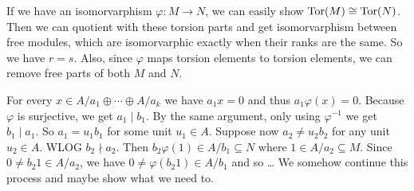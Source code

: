\begin{exercise}{4}
\begin{enumerate}
            If we have an isomorvarphism $\varphi \colon M \rightarrow N$, we can
            easily show $\operatorname{Tor}(M) \cong \operatorname{Tor}(N)$. Then we can quotient with these
            torsion parts and get isomorvarphism between free modules, which are
            isomorvarphic exactly when their ranks are the same. So we have $r =
            s$. Also, since $\varphi$ maps torsion elements to torsion elements, we
            can remove free parts of both $M$ and $N$.

            For every $x \in A/a_1 \oplus \cdots \oplus A/a_k$ we have $a_1 x =
            0$ and thus $a_1 \varphi(x) = 0$. Because $\varphi$ is surjective,
            we get $a_1 \mid b_1$. By the same argument, only using
            $\varphi^{-1}$ we get $b_1 \mid a_1$. So $a_1 = u_1 b_1$ for some
            unit $u_1 \in A$. Suppose now $a_2 \not= u_2 b_2$ for any unit $u_2
            \in A$. WLOG $b_2 \nmid a_2$. Then $b_2 \varphi(1) \in A/b_1
            \subseteq N$ where $1 \in A/a_2 \subseteq M$. Since $0 \not= b_2 1
            \in A/a_2$, we have $0 \not= \varphi(b_2 1) \in A/b_1$ and so \dots
            We somehow continue this process and maybe show what we need to.
    \end{enumerate}
\end{exercise}


